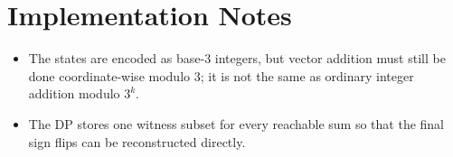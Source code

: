 \documentclass[11pt]{article}
\begin{document}
\section*{Implementation Notes}

\begin{itemize}[leftmargin=*]
    \item The states are encoded as base-$3$ integers, but vector addition must still be done
    coordinate-wise modulo $3$; it is not the same as ordinary integer addition modulo $3^k$.
    \item The DP stores one witness subset for every reachable sum so that the final sign flips can be
    reconstructed directly.
\end{itemize}
\end{document}
